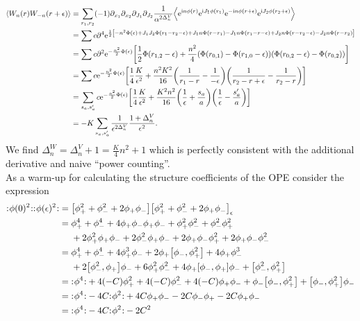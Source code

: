 \documentclass[english, parskip=full]{scrartcl}
\begin{document}
\begin{align}
\bra*{W_n(r) W_{-n}(r+\epsilon)} &= \sum_{r_1,r_2} (-1) \partial_{x_1} \partial_{x_2} \partial_{J_1} \partial_{J_2} \frac{1}{\alpha^{2\Delta^V_n}} \bra*{\powe{\i n\phi(r)} \powe{\i J_1\phi(r_1)} \powe{-\i n\phi(r+\epsilon)} \powe{\i J_2 \phi(r_2+\epsilon)}}\\
&= \sum c\partial^4 \powe{\frac{1}{2} \klb*{-n^2 \Phi(\epsilon) + J_1J_2 \Phi(r_1-r_2-\epsilon) + J_1n \Phi(r-r_1) - J_1n \Phi(r_1-r-\epsilon) + J_2n \Phi(r-r_2-\epsilon) - J_2n \Phi(r-r_2)}}\\
&= \sum c\partial^2 \powe{-\frac{n^2}{2} \Phi(\epsilon)} \klb*{\frac{1}{2} \Phi(r_{1,2}-\epsilon) + \frac{n^2}{4} \kla*{\Phi(r_{0,1}) - \Phi(r_{1,0}-\epsilon)} \kla*{\Phi(r_{0,2}-\epsilon) - \Phi(r_{0,2})}}\\
&= \sum c \powe{-\frac{n^2}{2}\Phi(\epsilon)} \klb*{\frac{1}{4} \frac{K}{\epsilon^2} + \frac{n^2K^2}{16} \kla*{\frac{1}{r_1-r} - \frac{1}{-\epsilon}} \kla*{\frac{1}{r_2-r+\epsilon} - \frac{1}{r_2-r}}}\\
&= \sum_{s_a,s_a'} c \powe{-\frac{n^2}{2} \Phi(\epsilon)} \klb*{\frac{1}{4} \frac{K}{\epsilon^2} + \frac{K^2n^2}{16} \kla*{\frac{1}{\epsilon} + \frac{s_a}{a}} \kla*{\frac{1}{\epsilon} - \frac{s_a'}{a}}}\\
&= -K\sum_{s_a,s_a'} \frac{1}{\epsilon^{2\Delta^V_n}} \frac{1+\Delta^V_n}{\epsilon^2}.
\end{align}
We find $\Delta^W_n = \Delta^V_n + 1 = \frac{K}{4}n^2 + 1$ which is perfectly consistent with the additional derivative and naive ``power counting''.\\
As a warm-up for calculating the structure coefficients of the OPE consider the expression
\begin{align}
\normord{\phi(0)^2} \normord{\phi(\epsilon)^2} &= \klb*{\phi_+^2 + \phi_-^2 + 2\phi_+\phi_-} \klb*{\phi_+^2 + \phi_-^2 + 2\phi_+\phi_-}_\epsilon \\
& = \bsplit{&\phi_+^4 + \phi_-^4 + 4\phi_+\phi_- \phi_+ \phi_- + \phi_+^2 \phi_-^2 + \phi_-^2 \phi_+^2 \\
&+ 2\phi_+^2 \phi_+\phi_- + 2\phi_-^2\phi_+\phi_- + 2\phi_+\phi_- \phi_+^2 + 2\phi_+\phi_- \phi_-^2}\\
&= \bsplit{&\phi_+^4 + \phi_-^4 + 4\phi_+^3\phi_- + 2\phi_+ \klb*{\phi_-,\phi_+^2} + 4\phi_+\phi_-^3 \\
&+ 2\klb*{\phi_-^2,\phi_+}\phi_- + 6\phi_+^2\phi_-^2 + 4\phi_+ \klb*{\phi_-,\phi_+} \phi_- + \klb*{\phi_-^2,\phi_+^2}}\\
&= \normord{\phi^4} + 4(-C)\phi_+^2  + 4 (-C)\phi_-^2 + 4(-C) \phi_+ \phi_- + \phi_- \klb*{\phi_-,\phi_+^2} + \klb*{\phi_-,\phi_+^2} \phi_-\\
&= \normord{\phi^4} - 4C \normord{\phi^2} + 4C\phi_+\phi_- - 2C \phi_-\phi_+ - 2C\phi_+\phi_-\\
&= \normord{\phi^4} - 4C\normord{\phi^2} - 2C^2
\end{align}
\end{document}
